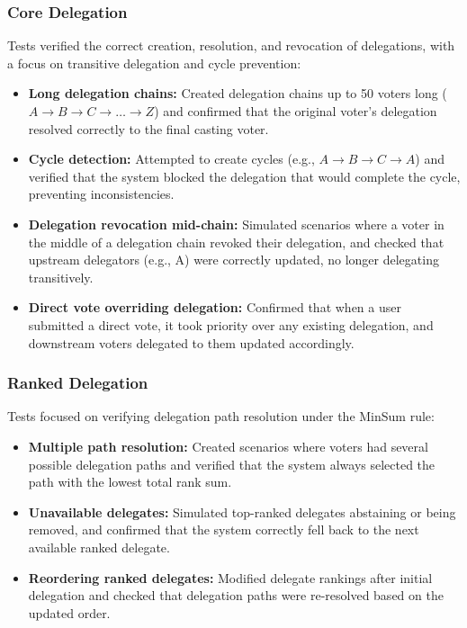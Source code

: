 \subsubsection{Core Delegation}
Tests verified the correct creation, resolution, and revocation of delegations, with a focus on transitive delegation and cycle prevention:
\begin{itemize}
    \item \textbf{Long delegation chains:} Created delegation chains up to 50 voters long ($A \to B \to C \to \dots \to Z$) and confirmed that the original voter's delegation resolved correctly to the final casting voter.

    \item \textbf{Cycle detection:} Attempted to create cycles (e.g., $A \to B \to C \to A$) and verified that the system blocked the delegation that would complete the cycle, preventing inconsistencies.

    \item \textbf{Delegation revocation mid-chain:} Simulated scenarios where a voter in the middle of a delegation chain revoked their delegation, and checked that upstream delegators (e.g., A) were correctly updated, no longer delegating transitively.

    \item \textbf{Direct vote overriding delegation:} Confirmed that when a user submitted a direct vote, it took priority over any existing delegation, and downstream voters delegated to them updated accordingly.
\end{itemize}

\subsubsection{Ranked Delegation}
Tests focused on verifying delegation path resolution under the MinSum rule:
\begin{itemize}
    \item \textbf{Multiple path resolution:} Created scenarios where voters had several possible delegation paths and verified that the system always selected the path with the lowest total rank sum.

    \item \textbf{Unavailable delegates:} Simulated top-ranked delegates abstaining or being removed, and confirmed that the system correctly fell back to the next available ranked delegate.

    \item \textbf{Reordering ranked delegates:} Modified delegate rankings after initial delegation and checked that delegation paths were re-resolved based on the updated order.
\end{itemize}

